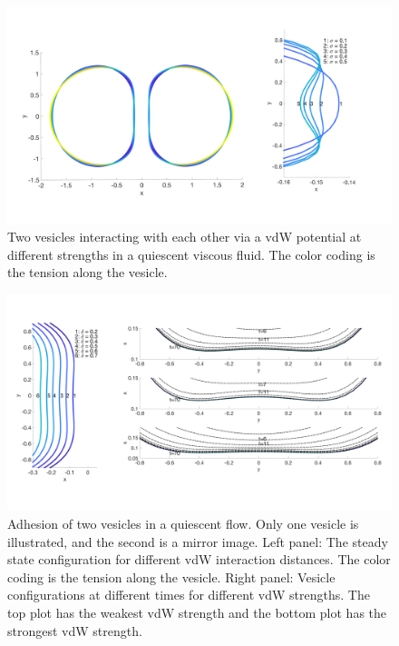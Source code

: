 \documentclass[%
preprint,
 amsmath,amssymb,
 aps,
]{revtex4-1}
\begin{document}
\begin{figure}
\includegraphics[keepaspectratio=true,scale=0.125]{figs/Nrelax2Ves02-rA0p96adR0p4.png}
\caption{Two vesicles interacting with each other via a vdW potential at different strengths in a quiescent viscous fluid. The color coding is the tension along the vesicle.}
\label{fig:qflow01}
\end{figure}

\begin{figure}
\includegraphics[keepaspectratio=true,scale=0.25]{figs/Nrelax2Ves02composite-draining.pdf}
\caption{Adhesion of two vesicles in a quiescent flow.  Only one vesicle
  is illustrated, and the second is a mirror image.  Left panel: The
  steady state configuration for different vdW interaction distances.
  The color coding is the tension along the vesicle.  Right panel:
  Vesicle configurations at different times for different vdW strengths.
  The top plot has the weakest vdW strength and the bottom plot has the
  strongest vdW strength.}
\label{fig:qflow02} 
\end{figure}

\end{document}
